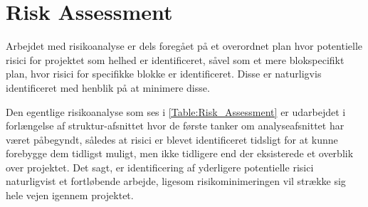 \chapter{Risk Assessment}

Arbejdet med risikoanalyse er dels foregået på et overordnet plan hvor potentielle risici for projektet som helhed er identificeret, såvel som et mere blokspecifikt plan, hvor risici for specifikke blokke er identificeret. Disse er naturligvis identificeret med henblik på at minimere disse.

Den egentlige risikoanalyse som ses i \ref{Table:Risk_Assessment} er udarbejdet i forlængelse af struktur-afsnittet hvor de første tanker om analyseafsnittet har været påbegyndt, således at risici er blevet identificeret tidsligt for at kunne forebygge dem tidligst muligt, men ikke tidligere end der eksisterede et overblik over projektet. Det sagt, er identificering af yderligere potentielle risici naturligvist et fortløbende arbejde, ligesom risikominimeringen vil strække sig hele vejen igennem projektet. 


